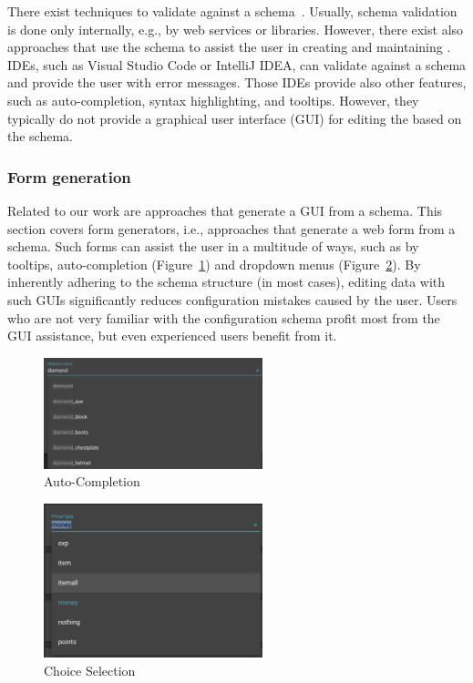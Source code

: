 There exist techniques to validate \cfgfiles{} against a schema~\cite{JSON_schema_vailidation,JSONValidation,baeldung_2023}.
Usually, schema validation is done only internally, e.g., by web services or libraries.
However, there exist also approaches that use the schema to assist the user in creating and maintaining \cfgfiles.
IDEs, such as Visual Studio Code or IntelliJ IDEA, can validate \cfgfiles{} against a schema and provide the user with error messages.
Those IDEs provide also other features, such as auto-completion, syntax highlighting, and tooltips.
However, they typically do not provide a graphical user interface (GUI) for editing the \cfgfiles{} based on the schema.


\subsubsection{Form generation}\label{subsubsec:schema-to-gui}

Related to our work are approaches that generate a GUI from a schema.
This section covers form generators, i.e., approaches that generate a web form from a schema.
Such forms can assist the user in a multitude of ways, such as by tooltips, auto-completion (Figure~\ref{fig:gui_advantage_autocomplete}) and dropdown menus (Figure~\ref{fig:gui_advantage_choiceselection}).
By inherently adhering to the schema structure (in most cases), editing data with such GUIs significantly reduces configuration mistakes caused by the user.
Users who are not very familiar with the configuration schema profit most from the GUI assistance, but even experienced users benefit from it.

\begin{figure}[htb]
    \centering
    \includegraphics[width=2.5in]{figures/gui_advantage_autocomplete}
    \caption{Auto-Completion}
    \label{fig:gui_advantage_autocomplete}
\end{figure}

\begin{figure}[htb]
    \centering
    \includegraphics[width=2.5in]{figures/gui_advantage_choiceselection}
    \caption{Choice Selection}
    \label{fig:gui_advantage_choiceselection}
\end{figure}

